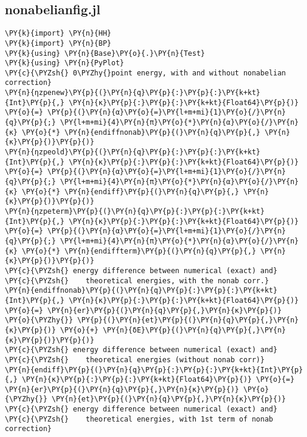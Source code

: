 \subsection{nonabelian\textunderscore fig.jl}\label{subsec:nonabelian}
\begin{Verbatim}[commandchars=\\\{\}]
\PY{k}{import} \PY{n}{HH}
\PY{k}{import} \PY{n}{BP}
\PY{k}{using} \PY{n}{Base}\PY{o}{.}\PY{n}{Test}
\PY{k}{using} \PY{n}{PyPlot}
\PY{c}{\PYZsh{} 0\PYZhy{}point energy, with and without nonabelian correction}
\PY{n}{ηzpenew}\PY{p}{(}\PY{n}{q}\PY{p}{:}\PY{p}{:}\PY{k+kt}{Int}\PY{p}{,} \PY{n}{κ}\PY{p}{:}\PY{p}{:}\PY{k+kt}{Float64}\PY{p}{)} \PY{o}{=} \PY{p}{(}\PY{n}{α}\PY{o}{=}\PY{l+m+mi}{1}\PY{o}{/}\PY{n}{q}\PY{p}{;} \PY{l+m+mi}{4}\PY{n}{π}\PY{o}{*}\PY{n}{α}\PY{o}{/}\PY{n}{κ} \PY{o}{*} \PY{n}{endiffnonab}\PY{p}{(}\PY{n}{q}\PY{p}{,} \PY{n}{κ}\PY{p}{)}\PY{p}{)}
\PY{n}{ηzpeold}\PY{p}{(}\PY{n}{q}\PY{p}{:}\PY{p}{:}\PY{k+kt}{Int}\PY{p}{,} \PY{n}{κ}\PY{p}{:}\PY{p}{:}\PY{k+kt}{Float64}\PY{p}{)} \PY{o}{=} \PY{p}{(}\PY{n}{α}\PY{o}{=}\PY{l+m+mi}{1}\PY{o}{/}\PY{n}{q}\PY{p}{;} \PY{l+m+mi}{4}\PY{n}{π}\PY{o}{*}\PY{n}{α}\PY{o}{/}\PY{n}{κ} \PY{o}{*} \PY{n}{endiff}\PY{p}{(}\PY{n}{q}\PY{p}{,} \PY{n}{κ}\PY{p}{)}\PY{p}{)}
\PY{n}{ηzpeterm}\PY{p}{(}\PY{n}{q}\PY{p}{:}\PY{p}{:}\PY{k+kt}{Int}\PY{p}{,} \PY{n}{κ}\PY{p}{:}\PY{p}{:}\PY{k+kt}{Float64}\PY{p}{)} \PY{o}{=} \PY{p}{(}\PY{n}{α}\PY{o}{=}\PY{l+m+mi}{1}\PY{o}{/}\PY{n}{q}\PY{p}{;} \PY{l+m+mi}{4}\PY{n}{π}\PY{o}{*}\PY{n}{α}\PY{o}{/}\PY{n}{κ} \PY{o}{*} \PY{n}{endiffterm}\PY{p}{(}\PY{n}{q}\PY{p}{,} \PY{n}{κ}\PY{p}{)}\PY{p}{)}
\PY{c}{\PYZsh{} energy difference between numerical (exact) and}
\PY{c}{\PYZsh{}    theoretical energies, with the nonab corr.}
\PY{n}{endiffnonab}\PY{p}{(}\PY{n}{q}\PY{p}{:}\PY{p}{:}\PY{k+kt}{Int}\PY{p}{,} \PY{n}{κ}\PY{p}{:}\PY{p}{:}\PY{k+kt}{Float64}\PY{p}{)} \PY{o}{=} \PY{n}{er}\PY{p}{(}\PY{n}{q}\PY{p}{,}\PY{n}{κ}\PY{p}{)} \PY{o}{\PYZhy{}} \PY{p}{(}\PY{n}{et}\PY{p}{(}\PY{n}{q}\PY{p}{,}\PY{n}{κ}\PY{p}{)} \PY{o}{+} \PY{n}{δE}\PY{p}{(}\PY{n}{q}\PY{p}{,}\PY{n}{κ}\PY{p}{)}\PY{p}{)}
\PY{c}{\PYZsh{} energy difference between numerical (exact) and}
\PY{c}{\PYZsh{}    theoretical energies (without nonab corr)}
\PY{n}{endiff}\PY{p}{(}\PY{n}{q}\PY{p}{:}\PY{p}{:}\PY{k+kt}{Int}\PY{p}{,} \PY{n}{κ}\PY{p}{:}\PY{p}{:}\PY{k+kt}{Float64}\PY{p}{)} \PY{o}{=}  \PY{n}{er}\PY{p}{(}\PY{n}{q}\PY{p}{,}\PY{n}{κ}\PY{p}{)} \PY{o}{\PYZhy{}} \PY{n}{et}\PY{p}{(}\PY{n}{q}\PY{p}{,}\PY{n}{κ}\PY{p}{)}
\PY{c}{\PYZsh{} energy difference between numerical (exact) and}
\PY{c}{\PYZsh{}    theoretical energies, with 1st term of nonab correction}

\end{Verbatim}
